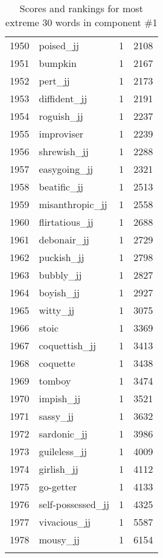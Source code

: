 \begin{longtable}[!htbp]{| rlr@{.}l |}
    1950 & poised\_jj & 1 & 2108 \\
    1951 & bumpkin & 1 & 2167 \\
    1952 & pert\_jj & 1 & 2173 \\
    1953 & diffident\_jj & 1 & 2191 \\
    1954 & roguish\_jj & 1 & 2237 \\
    1955 & improviser & 1 & 2239 \\
    1956 & shrewish\_jj & 1 & 2288 \\
    1957 & easygoing\_jj & 1 & 2321 \\
    1958 & beatific\_jj & 1 & 2513 \\
    1959 & misanthropic\_jj & 1 & 2558 \\
    1960 & flirtatious\_jj & 1 & 2688 \\
    1961 & debonair\_jj & 1 & 2729 \\
    1962 & puckish\_jj & 1 & 2798 \\
    1963 & bubbly\_jj & 1 & 2827 \\
    1964 & boyish\_jj & 1 & 2927 \\
    1965 & witty\_jj & 1 & 3075 \\
    1966 & stoic & 1 & 3369 \\
    1967 & coquettish\_jj & 1 & 3413 \\
    1968 & coquette & 1 & 3438 \\
    1969 & tomboy & 1 & 3474 \\
    1970 & impish\_jj & 1 & 3521 \\
    1971 & sassy\_jj & 1 & 3632 \\
    1972 & sardonic\_jj & 1 & 3986 \\
    1973 & guileless\_jj & 1 & 4009 \\
    1974 & girlish\_jj & 1 & 4112 \\
    1975 & go-getter & 1 & 4133 \\
    1976 & self-possessed\_jj & 1 & 4325 \\
    1977 & vivacious\_jj & 1 & 5587 \\
    1978 & mousy\_jj & 1 & 6154 \\
    \hline
    \caption{Scores and rankings for most extreme 30 words in component \#1} \\
\end{longtable}
